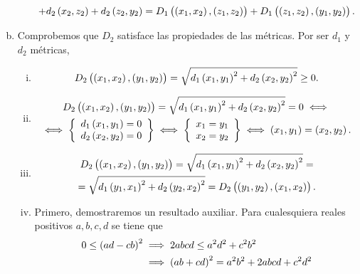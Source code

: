 \begin{ej}
\begin{enumerate}[(a)]
\begin{enumerate}[i)]
\begin{gather*}
                + d_2 \left( x_2, z_2 \right) + d_2 \left( z_2, y_2 \right) = D_1 \left( \left( x_1, x_2 \right) , \left( z_1 , z_2 \right) \right) + D_1 \left( \left( z_1, z_2 \right) , \left( y_1 , y_2 \right) \right).
            \end{gather*}
		\end{enumerate}
		\item Comprobemos que $D_2$ satisface las propiedades de las métricas. Por ser $d_1$ y $d_2$ métricas,
		\begin{enumerate}[i)]
            \item
            \[
                D_2 \left( \left( x_1, x_2 \right) , \left( y_1 , y_2 \right) \right) = \sqrt{ d_1 \left( x_1, y_1\right) ^2 + d_2 \left( x_2 , y_2 \right)^2 } \geq 0.
            \]
            \item 
            \begin{gather*}
                D_2 \left( \left( x_1, x_2 \right) , \left( y_1 , y_2 \right) \right) = \sqrt{ d_1 \left( x_1, y_1\right) ^2 + d_2 \left( x_2 , y_2 \right)^2 } = 0 \iff \\
                \iff \left\{ \begin{array}{c}
                    d_1 \left( x_1, y_1 \right) = 0 \\
                    d_2 \left( x_2, y_2 \right) = 0
                \end{array} \right\} \iff  \left\{ \begin{array}{c}
                    x_1=y_1 \\
                    x_2=y_2
                \end{array} \right\} \iff \left( x_1, y_1 \right) = \left( x_2, y_2 \right).
            \end{gather*}
            \item 
            \begin{gather*}
                D_2 \left( \left( x_1, x_2 \right) , \left( y_1 , y_2 \right) \right) = \sqrt{ d_1 \left( x_1, y_1\right) ^2 + d_2 \left( x_2 , y_2 \right)^2 } = \\ 
                = \sqrt{ d_1 \left( y_1, x_1\right) ^2 + d_2 \left( y_2 , x_2 \right)^2 } = D_2 \left( \left( y_1, y_2 \right) , \left( x_1 , x_2 \right) \right) .
            \end{gather*}
            \item Primero, demostraremos un resultado auxiliar. Para cualesquiera reales positivos $a, b, c, d$ se tiene que
            \begin{align} \nonumber
                0 \leq \lp ad -cb \rp ^2 &\implies 2abcd \leq a^2d^2+c^2b^2 \\  \nonumber
                &\implies \lp ab+cd \rp ^2 = a^2b^2 + 2abcd + c^2d^2 \\ \nonumber

\end{align}
\end{enumerate}
\end{enumerate}
\end{ej}
